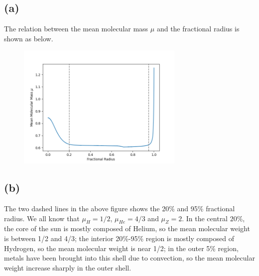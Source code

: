 \documentclass[a4paper,12pt]{article}
\begin{document}
\subsection*{(a)}
The relation between the mean molecular mass $\mu$ and the fractional radius is shown as below.
\begin{figure}[htbp]
    \centering
    \includegraphics*[width=8cm]{mu.png}
\end{figure}

\subsection*{(b)}
The two dashed lines in the above figure shows the 20\% and 95\% fractional radius. 
We all know that $\mu_H = 1/2$, $\mu_{He}=4/3$ and $\mu_{Z} = 2$. In the central $20\%$, 
the core of the sun is mostly composed of Helium, so the mean molecular weight is between 1/2 and 
4/3; the interior 20\%-95\% region is mostly composed of Hydrogen, so the mean molecular weight is 
near 1/2; in the outer 5\% region, metals have been brought into this shell due to convection, so the 
mean molecular weight increase sharply in the outer shell.
\end{document}
